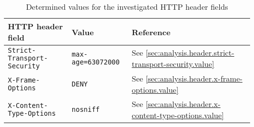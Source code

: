 \begin{table}[h]
    \begin{tabularx}{\textwidth}{|l|X|l|}
        \hline
        \textbf{HTTP header field}         & \textbf{Value}            & \textbf{Reference}                                        \\ \hline
        \texttt{Strict-Transport-Security} & \texttt{max-age=63072000} & See \ref{sec:analysis.header.strict-transport-security.value} \\ \hline
        \texttt{X-Frame-Options}           & \texttt{DENY}             & See \ref{sec:analysis.header.x-frame-options.value}           \\ \hline
        \texttt{X-Content-Type-Options}    & \texttt{nosniff}          & See \ref{sec:analysis.header.x-content-type-options.value}    \\ \hline
    \end{tabularx}
    \caption{Determined values for the investigated HTTP header fields}
    \label{tab:solution.http-header.target-values}
\end{table}